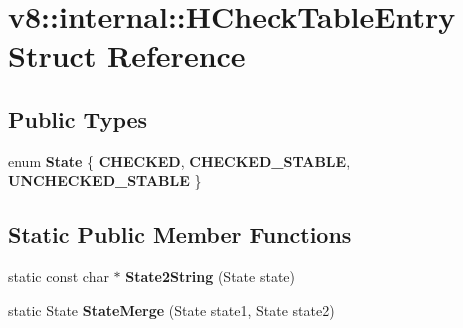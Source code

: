 \hypertarget{structv8_1_1internal_1_1_h_check_table_entry}{}\section{v8\+:\+:internal\+:\+:H\+Check\+Table\+Entry Struct Reference}
\label{structv8_1_1internal_1_1_h_check_table_entry}
\subsection*{Public Types}
\begin{DoxyCompactItemize}
\item 
\hypertarget{structv8_1_1internal_1_1_h_check_table_entry_a851b29f058c185cb8340eaf3376cf3f3}{}enum {\bfseries State} \{ {\bfseries C\+H\+E\+C\+K\+E\+D}, 
{\bfseries C\+H\+E\+C\+K\+E\+D\+\_\+\+S\+T\+A\+B\+L\+E}, 
{\bfseries U\+N\+C\+H\+E\+C\+K\+E\+D\+\_\+\+S\+T\+A\+B\+L\+E}
 \}\label{structv8_1_1internal_1_1_h_check_table_entry_a851b29f058c185cb8340eaf3376cf3f3}

\end{DoxyCompactItemize}
\subsection*{Static Public Member Functions}
\begin{DoxyCompactItemize}
\item 
\hypertarget{structv8_1_1internal_1_1_h_check_table_entry_a89c4964ddaa0108b4f2cfb754080ee3b}{}static const char $\ast$ {\bfseries State2\+String} (State state)\label{structv8_1_1internal_1_1_h_check_table_entry_a89c4964ddaa0108b4f2cfb754080ee3b}

\item 
\hypertarget{structv8_1_1internal_1_1_h_check_table_entry_aaaf037993cad2562f642e534145947b9}{}static State {\bfseries State\+Merge} (State state1, State state2)\label{structv8_1_1internal_1_1_h_check_table_entry_aaaf037993cad2562f642e534145947b9}

\end{DoxyCompactItemize}
